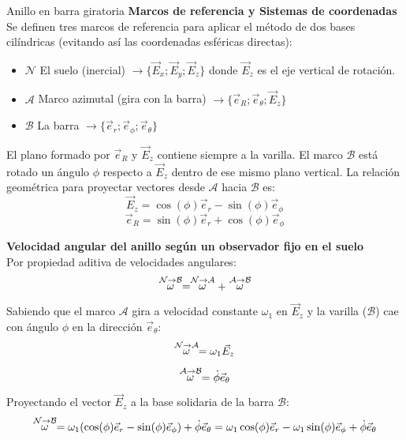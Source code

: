\begin{solucion}{Anillo en barra giratoria}
\textbf{Marcos de referencia y Sistemas de coordenadas}\\
Se definen tres marcos de referencia para aplicar el método de dos bases cilíndricas (evitando así las coordenadas esféricas directas):
\begin{itemize}
    \item $\mathcal{N}$ El suelo (inercial) $\longrightarrow\{\vec{E}_x;\vec{E}_y;\vec{E}_z\}$ donde $\vec{E}_z$ es el eje vertical de rotación.
    \item $\mathcal{A}$ Marco azimutal (gira con la barra) $\longrightarrow\{\vec{e}_R;\vec{e}_\theta;\vec{E}_z\}$
    \item $\mathcal{B}$ La barra $\longrightarrow\{\vec{e}_r;\vec{e}_\phi;\vec{e}_\theta\}$
\end{itemize}
El plano formado por $\vec{e}_R$ y $\vec{E}_z$ contiene siempre a la varilla. El marco $\mathcal{B}$ está rotado un ángulo $\phi$ respecto a $\vec{E}_z$ dentro de ese mismo plano vertical.
La relación geométrica para proyectar vectores desde $\mathcal{A}$ hacia $\mathcal{B}$ es:
$$\vec{E}_z = \cos(\phi)\vec{e}_r - \sin(\phi)\vec{e}_\phi$$
$$\vec{e}_R = \sin(\phi)\vec{e}_r + \cos(\phi)\vec{e}_\phi$$


\textbf{Velocidad angular del anillo según un observador fijo en el suelo}\\
Por propiedad aditiva de velocidades angulares:
$$\stackrel{\mathcal{N} \to \mathcal{B}}{\omega} = \stackrel{\mathcal{N} \to \mathcal{A}}{\omega} + \stackrel{\mathcal{A} \to \mathcal{B}}{\omega}$$
Sabiendo que el marco $\mathcal{A}$ gira a velocidad constante $\omega_1$ en $\vec{E}_z$ y la varilla ($\mathcal{B}$) cae con ángulo $\phi$ en la dirección $\vec{e}_\theta$:
$$\stackrel{\mathcal{N} \to \mathcal{A}}{\omega} = \omega_1\vec{E}_z$$
$$\stackrel{\mathcal{A} \to \mathcal{B}}{\omega} = \dot\phi\vec{e}_\theta$$
Proyectando el vector $\vec{E}_z$ a la base solidaria de la barra $\mathcal{B}$:
$$\stackrel{\mathcal{N} \to \mathcal{B}}{\omega} = \omega_1(\cos(\phi)\vec{e}_r - \sin(\phi)\vec{e}_\phi) + \dot\phi\vec{e}_\theta = \omega_1\cos(\phi)\vec{e}_r - \omega_1\sin(\phi)\vec{e}_\phi + \dot\phi\vec{e}_\theta$$


\end{solucion}
